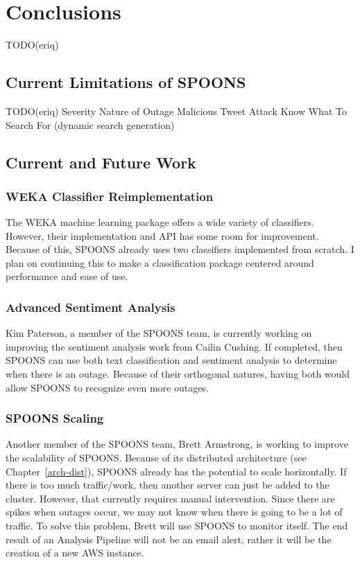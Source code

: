 \documentclass[12pt]{ucthesis}
\begin{document}
\part{Conclusions}
\label{conclusions}
TODO(eriq)

\chapter{Current Limitations of SPOONS}
\label{limitations}
TODO(eriq)
Severity
Nature of Outage
Malicious Tweet Attack
Know What To Search For (dynamic search generation)

\chapter{Current and Future Work}
\label{future-work}

\section{WEKA Classifier Reimplementation}
\label{future-work-weka}
The WEKA machine learning package offers a wide variety of classifiers.
However, their implementation and API has some room for improvement.
Because of this, SPOONS already uses two classifiers implemented from scratch.
I plan on continuing this to make a classification package centered around performance
and ease of use.

\section{Advanced Sentiment Analysis}
\label{future-work-kim}
Kim Paterson, a member of the SPOONS team, is currently working on improving the sentiment
analysis work from Cailin Cushing\cite{cailinThesis}. If completed, then SPOONS can use
both text classification and sentiment analysis to determine when there is an outage.
Because of their orthogonal natures, having both would allow SPOONS to recognize even more outages.

\section{SPOONS Scaling}
\label{future-work-brett}
Another member of the SPOONS team, Brett Armstrong, is working to improve the scalability of SPOONS.
Because of its distributed architecture (see Chapter~\ref{arch-dist}), SPOONS already has the potential to
scale horizontally. If there is too much traffic/work, then another server can just be added to the cluster.
However, that currently requires manual intervention. Since there are spikes when outages occur, we may not know
when there is going to be a lot of traffic. To solve this problem, Brett will use SPOONS to monitor itself.
The end result of an Analysis Pipeline will not be an email alert, rather it will be the creation of a new
AWS instance.
\end{document}
